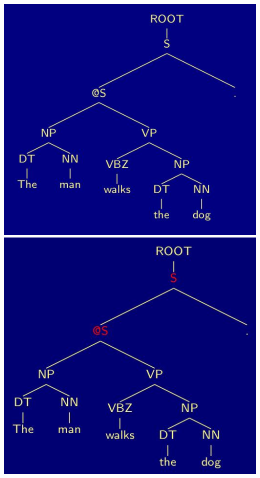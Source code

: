 \includegraphics[width=\textwidth]{media/relation_extraction_0.jpg}
\includegraphics[width=\textwidth]{media/relation_extraction_4.jpg}
